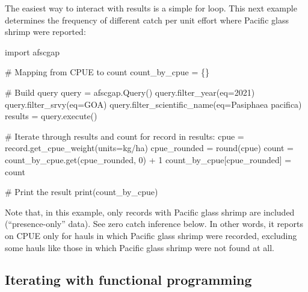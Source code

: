 \documentclass[
  letterpaper,
  oneside,
  open=any]{scrbook}
\newenvironment{Shaded}{\begin{snugshade}}{\end{snugshade}}
\newcommand{\AttributeTok}[1]{\textcolor[rgb]{0.40,0.45,0.13}{#1}}
\newcommand{\CommentTok}[1]{\textcolor[rgb]{0.37,0.37,0.37}{#1}}
\newcommand{\ControlFlowTok}[1]{\textcolor[rgb]{0.00,0.23,0.31}{#1}}
\newcommand{\DecValTok}[1]{\textcolor[rgb]{0.68,0.00,0.00}{#1}}
\newcommand{\FunctionTok}[1]{\textcolor[rgb]{0.28,0.35,0.67}{#1}}
\newcommand{\NormalTok}[1]{\textcolor[rgb]{0.00,0.23,0.31}{#1}}
\newcommand{\OtherTok}[1]{\textcolor[rgb]{0.00,0.23,0.31}{#1}}
\newcommand{\SpecialCharTok}[1]{\textcolor[rgb]{0.37,0.37,0.37}{#1}}
\newcommand{\StringTok}[1]{\textcolor[rgb]{0.13,0.47,0.30}{#1}}
\begin{document}
The easiest way to interact with results is a simple for loop. This next
example determines the frequency of different catch per unit effort
where Pacific glass shrimp were reported:

\begin{Shaded}
\begin{Highlighting}[]
\NormalTok{import afscgap}

\CommentTok{\# Mapping from CPUE to count}
\NormalTok{count\_by\_cpue }\OtherTok{=}\NormalTok{ \{\}}

\CommentTok{\# Build query}
\NormalTok{query }\OtherTok{=} \FunctionTok{afscgap.Query}\NormalTok{()}
\FunctionTok{query.filter\_year}\NormalTok{(}\AttributeTok{eq=}\DecValTok{2021}\NormalTok{)}
\FunctionTok{query.filter\_srvy}\NormalTok{(}\AttributeTok{eq=}\StringTok{\textquotesingle{}GOA\textquotesingle{}}\NormalTok{)}
\FunctionTok{query.filter\_scientific\_name}\NormalTok{(}\AttributeTok{eq=}\StringTok{\textquotesingle{}Pasiphaea pacifica\textquotesingle{}}\NormalTok{)}
\NormalTok{results }\OtherTok{=} \FunctionTok{query.execute}\NormalTok{()}

\CommentTok{\# Iterate through results and count}
\ControlFlowTok{for}\NormalTok{ record }\ControlFlowTok{in}\NormalTok{ results}\SpecialCharTok{:}
\NormalTok{  cpue }\OtherTok{=} \FunctionTok{record.get\_cpue\_weight}\NormalTok{(}\AttributeTok{units=}\StringTok{\textquotesingle{}kg/ha\textquotesingle{}}\NormalTok{)}
\NormalTok{  cpue\_rounded }\OtherTok{=} \FunctionTok{round}\NormalTok{(cpue)}
\NormalTok{  count }\OtherTok{=} \FunctionTok{count\_by\_cpue.get}\NormalTok{(cpue\_rounded, }\DecValTok{0}\NormalTok{) }\SpecialCharTok{+} \DecValTok{1}
\NormalTok{  count\_by\_cpue[cpue\_rounded] }\OtherTok{=}\NormalTok{ count}

\CommentTok{\# Print the result}
\FunctionTok{print}\NormalTok{(count\_by\_cpue)}
\end{Highlighting}
\end{Shaded}

Note that, in this example, only records with Pacific glass shrimp are
included (``presence-only'' data). See zero catch inference below. In
other words, it reports on CPUE only for hauls in which Pacific glass
shrimp were recorded, excluding some hauls like those in which Pacific
glass shrimp were not found at all.

\hypertarget{iterating-with-functional-programming}{%
\subsection{Iterating with functional
programming}\label{iterating-with-functional-programming}}
\end{document}
